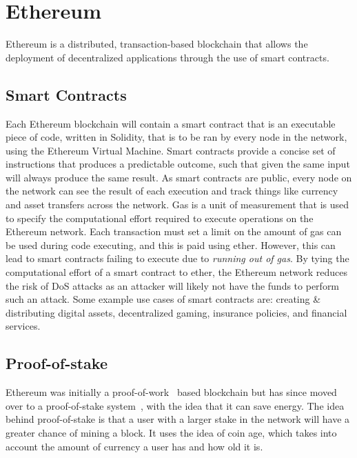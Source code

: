 
\section{Ethereum}

Ethereum is a distributed, transaction-based blockchain that allows the deployment of decentralized applications through the use of smart contracts.

\subsection{Smart Contracts}

Each Ethereum blockchain will contain a smart contract that is an executable piece of code, written in Solidity, that is to be ran by every node in the network, using the Ethereum Virtual Machine. Smart contracts provide a concise set of instructions that produces a predictable outcome, such that given the same input will always produce the same result.
As smart contracts are public, every node on the network can see the result of each execution and track things like currency and asset transfers across the network.
\x
Gas is a unit of measurement that is used to specify the computational effort required to execute operations on the Ethereum network. Each transaction must set a limit on the amount of gas can be used during code executing, and this is paid using ether. However, this can lead to smart contracts failing to execute due to \textit{running out of gas}.
By tying the computational effort of a smart contract to ether, the Ethereum network reduces the risk of DoS attacks as an attacker will likely not have the funds to perform such an attack.
\x
Some example use cases of smart contracts are: creating \& distributing digital assets, decentralized gaming, insurance policies, and financial services.

\subsection{Proof-of-stake}

Ethereum was initially a proof-of-work~\cite{mingxiao_review_2017} based blockchain but has since moved over to a proof-of-stake system~\cite{mingxiao_review_2017}, with the idea that it can save energy. The idea behind proof-of-stake is that a user with a larger stake in the network will have a greater chance of mining a block. It uses the idea of coin age, which takes into account the amount of currency a user has and how old it is.


